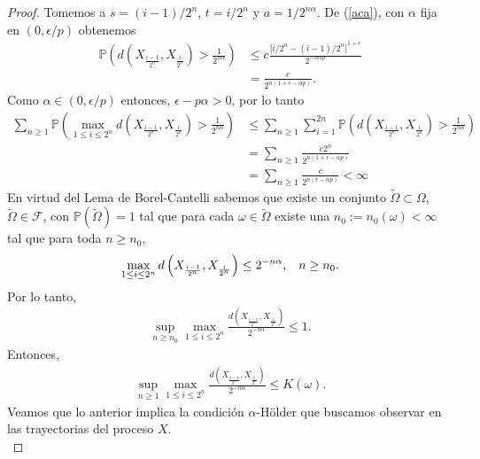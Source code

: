 \begin{proof}
Tomemos a $s = (i-1)/2^n$, $t = i/2^n$ y $a = 1/2^{n \alpha}$. De (\ref{aca}), con $\alpha$ fija en $(0, \epsilon / p)$ obtenemos
	\begin{align*}
	\mathbb{P} \left( d(X_{\frac{i-1}{2^n}}, X_{\frac{i}{2^n}}) > \frac{1}{2^{n \alpha}} \right) & \leq c \frac{| i/2^n - (i-1)/2^n|^{1+\epsilon}}{2^{- n \alpha p}} \\
	& = \frac{c}{2^{n(1 + \epsilon - \alpha p)}}.
	\end{align*}
Como $\alpha \in (0, \epsilon / p)$ entonces, $\epsilon - p \alpha > 0$, por lo tanto
	\begin{align*}
	\sum_{n \geq 1} \mathbb{P} \left( \max_{1 \leq i \leq 2^n} d(X_{\frac{i-1}{2^n}}, X_{\frac{i}{2^n}}) > \frac{1}{2^{n \alpha}} \right)  & \leq \sum_{n \geq 1} \sum_{i=1}^{2n} \mathbb{P} \left( d(X_{\frac{i-1}{2^n}}, X_{\frac{i}{2^n}}) > \frac{1}{2^{n \alpha}} \right) \\
	& = \sum_{n \geq 1} \frac{c2^n}{2^{n(1 + \epsilon - \alpha p)}} \\
	& = \sum_{n \geq 1} \frac{c}{2^{n(\epsilon - \alpha p)}} < \infty
	\end{align*}
En virtud del Lema de Borel-Cantelli sabemos que existe un conjunto $\tilde{\Omega} \subset \Omega$, $\tilde{\Omega} \in \mathcal{F}$, con $\mathbb{P} (\tilde{\Omega}) = 1$ tal que para cada $\omega \in \tilde{\Omega}$ existe una $n_0 := n_0 (\omega) < \infty$ tal que para toda $n \geq n_0$, 
	\begin{align}
	\max_{1 \leq i \leq 2^n} d \left(X_{\frac{i-1}{2^n}}, X_{\frac{i}{2^n}}\right) \leq 2^{-n \alpha}, \hspace{0.3cm} n \geq n_0. \label{acb}
	\end{align}
Por lo tanto, 
	\begin{align*}
	\sup_{n \geq n_0} \max_{1 \leq i \leq 2^n} \frac{d \left(X_{\frac{i-1}{2^n}}, X_{\frac{i}{2^n}}\right)}{2^{-n \alpha}} \leq 1.
	\end{align*}
Entonces, 
	\begin{align*}
	\sup_{n \geq 1} \max_{1 \leq i \leq 2^n} \frac{d \left(X_{\frac{i-1}{2^n}}, X_{\frac{i}{2^n}}\right)}{2^{-n \alpha}} \leq K(\omega).
	\end{align*}
Veamos que lo anterior implica la condición $\alpha$-Hölder que buscamos observar en las trayectorias del proceso $X$. \\


\end{proof}
